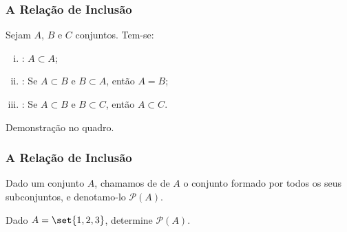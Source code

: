 \documentclass[brazil, notheorems, 10pt]{beamer}
\begin{document}
\begin{frame}
\frametitle{A Relação de Inclusão} %
\begin{Prop}
Sejam $A$, $B$ e $C$ conjuntos. Tem-se:
\begin{enumerate}[i.]
	\item {}: $A \subset A$;
	\item {}: Se $A \subset B$ e $B \subset A$,
	então $A = B$;
	\item {}: Se $A \subset B$ e $B \subset C$,
	então $A \subset C$.
\end{enumerate}
\end{Prop}

Demonstração no quadro.


\end{frame}


\begin{frame}
\frametitle{A Relação de Inclusão} %

\begin{Def}
Dado um conjunto $A$, chamamos de  de $A$ o conjunto formado por todos
os seus subconjuntos, e denotamo-lo $\mathcal{P}(A)$.
\end{Def}

\begin{Exem}
Dado $A = \set {1, 2, 3}$, determine $\mathcal{P}(A)$.
\end{Exem}



\end{frame}
\end{document}
